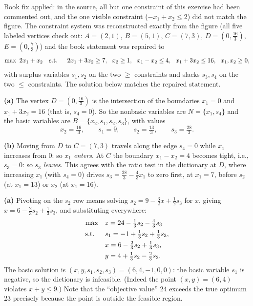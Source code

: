 
\begin{qaflag}
Book fix applied: in the source, all but one constraint of this exercise
had been commented out, and the one visible constraint
($-x_1 + x_2 \leq 2$) did not match the figure. The constraint system was
reconstructed exactly from the figure (all five labeled vertices check
out: $A = (2,1)$, $B = (5,1)$, $C = (7,3)$, $D = (0, \tfrac{16}{3})$,
$E = (0, \tfrac{7}{3})$) and the book statement was repaired to
\[
\max\ 2x_1 + x_2 \quad \text{s.t.}\;\;\quad 2x_1 + 3x_2 \geq 7,\ \
x_2 \geq 1,\ \ x_1 - x_2 \leq 4,\ \ x_1 + 3x_2 \leq 16,\ \ x_1, x_2 \geq 0,
\]
with surplus variables $s_1, s_2$ on the two $\geq$ constraints and slacks
$s_3, s_4$ on the two $\leq$ constraints. The solution below matches the
repaired statement.
\end{qaflag}

\textbf{(a)} The vertex $D = (0, \tfrac{16}{3})$ is the intersection of
the boundaries $x_1 = 0$ and $x_1 + 3x_2 = 16$ (that is, $s_4 = 0$). So
the nonbasic variables are $N = \{x_1, s_4\}$ and the basic variables are
$B = \{x_2, s_1, s_2, s_3\}$, with values
\[
x_2 = \tfrac{16}{3}, \qquad s_1 = 9, \qquad s_2 = \tfrac{13}{3},
\qquad s_3 = \tfrac{28}{3}.
\]

\textbf{(b)} Moving from $D$ to $C = (7, 3)$ travels along the edge
$s_4 = 0$ while $x_1$ increases from $0$: so \emph{$x_1$ enters}. At $C$
the boundary $x_1 - x_2 = 4$ becomes tight, i.e., $s_3 = 0$: so
\emph{$s_3$ leaves}. This agrees with the ratio test in the dictionary at
$D$, where increasing $x_1$ (with $s_4 = 0$) drives
$s_3 = \tfrac{28}{3} - \tfrac43 x_1$ to zero first, at $x_1 = 7$,
before $s_2$ (at $x_1 = 13$) or $x_2$ (at $x_1 = 16$).


\textbf{(a)} Pivoting on the $s_2$ row means solving
$s_2 = 9 - \tfrac32 x + \tfrac12 s_3$ for $x$, giving
$x = 6 - \tfrac23 s_2 + \tfrac13 s_3$, and substituting everywhere:
\[
\begin{aligned}
\max\quad & z = 24 - \tfrac13 s_2 - \tfrac43 s_3 \\
\text{s.t.}\;\;\quad & s_1 = -1 + \tfrac13 s_2 + \tfrac13 s_3, \\
& x = 6 - \tfrac23 s_2 + \tfrac13 s_3, \\
& y = 4 + \tfrac13 s_2 - \tfrac23 s_3.
\end{aligned}
\]
The basic solution is $(x, y, s_1, s_2, s_3) = (6, 4, -1, 0, 0)$: the
basic variable $s_1$ is negative, so the dictionary is infeasible. (Indeed
the point $(x, y) = (6, 4)$ violates $x + y \leq 9$.) Note that the
``objective value'' $24$ exceeds the true optimum $23$ precisely because
the point is outside the feasible region.

